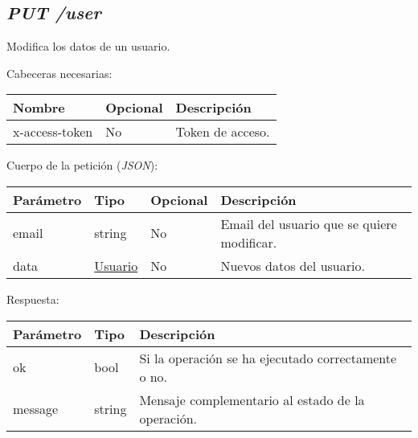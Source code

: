 \pagebreak
\subsection{\textit{PUT /user}}
Modifica los datos de un usuario.

Cabeceras necesarias:
\begin{table}[h!]
	\centering
	\begin{adjustbox}{max width=\textwidth}
	\begin{tabular}{|l|l|l|}
		\hline
		Nombre & Opcional & Descripción \\ \hline
		x-access-token & No & Token de acceso. \\ \hline
	\end{tabular}
\end{adjustbox}
\end{table}



Cuerpo de la petición (\textit{JSON}):
\begin{table}[h!]
	\centering
	\begin{adjustbox}{max width=\textwidth}
	\begin{tabular}{|l|l|l|l|}
		\hline
		Parámetro & Tipo & Opcional & Descripción \\ \hline
		email & string & No & Email del usuario que se quiere modificar. \\ \hline
		data & \hyperref[sec:usuario]{Usuario} & No & Nuevos datos del usuario. \\ \hline
	\end{tabular}
\end{adjustbox}
\end{table}

Respuesta:
\begin{table}[h!]
	\centering
	\begin{adjustbox}{max width=\textwidth}
	\begin{tabular}{|l|l|l|}
		\hline
		Parámetro & Tipo & Descripción \\ \hline
		ok & bool & Si la operación se ha ejecutado correctamente o no. \\ \hline
		message & string & Mensaje complementario al estado de la operación. \\ \hline
	\end{tabular}
\end{adjustbox}
\end{table}








